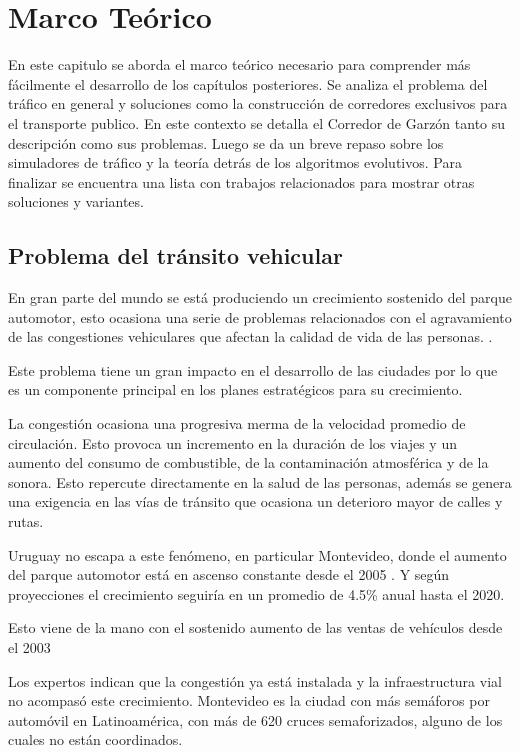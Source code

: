 \chapter{Marco Teórico}

 En este capitulo se aborda el marco teórico necesario para comprender más fácilmente el desarrollo de los capítulos posteriores. Se analiza el problema del tráfico en general y soluciones como la construcción de corredores exclusivos para el transporte publico. En este contexto se detalla el Corredor de Garzón tanto su descripción como sus problemas. Luego se da un breve repaso sobre los simuladores de tráfico y la teoría detrás de los algoritmos evolutivos. Para finalizar se encuentra una lista con trabajos relacionados para mostrar otras soluciones y variantes.

\section{Problema del tránsito vehicular}

En gran parte del mundo se está produciendo un crecimiento sostenido del parque automotor, esto ocasiona una serie de problemas relacionados con el agravamiento de las congestiones vehiculares que afectan la calidad de vida de las personas.  \citep{Cepal2003}.

Este problema tiene un gran impacto en el desarrollo de las ciudades por lo que es un componente principal en los planes estratégicos para su crecimiento.

La congestión ocasiona una progresiva merma de la velocidad promedio de circulación. Esto provoca un incremento en la duración de los viajes y un aumento del consumo de combustible, de la contaminación atmosférica y de la sonora. Esto repercute directamente en la salud de las personas, además se genera una exigencia en las vías de tránsito que ocasiona un deterioro mayor de calles y rutas.

Uruguay no escapa a este fenómeno, en particular Montevideo, donde el aumento del parque automotor está en ascenso constante desde el 2005 \citep{INE2014}.
Y según proyecciones el crecimiento seguiría en un promedio de 4.5\% anual hasta el 2020. \citep{BBVA2013}

Esto viene de la mano con el sostenido aumento de las ventas de vehículos  desde el 2003 \citep{Autoanuario2014}

Los expertos indican que la congestión ya está instalada y la infraestructura vial no acompasó este crecimiento. Montevideo es la ciudad con más semáforos por automóvil en Latinoamérica, con más de 620 cruces semaforizados, alguno de los cuales no están coordinados.\citep{Subrayado2013}

